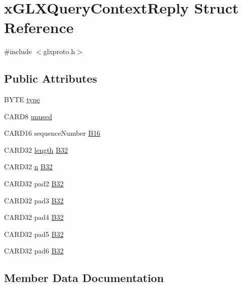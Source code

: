 \hypertarget{structx_g_l_x_query_context_reply}{}\section{x\+G\+L\+X\+Query\+Context\+Reply Struct Reference}
\label{structx_g_l_x_query_context_reply}


{\ttfamily \#include $<$glxproto.\+h$>$}

\subsection*{Public Attributes}
\begin{DoxyCompactItemize}
\item 
B\+Y\+TE \hyperlink{structx_g_l_x_query_context_reply_abcbb01ecc0ac4007ef024fc22a8637fd}{type}
\item 
C\+A\+R\+D8 \hyperlink{structx_g_l_x_query_context_reply_ad0794dd8b9bdbcffa2e2ac393abc31fe}{unused}
\item 
C\+A\+R\+D16 sequence\+Number \hyperlink{structx_g_l_x_query_context_reply_a8a1d02d94b834484164e9c7b7152c40f}{B16}
\item 
C\+A\+R\+D32 \hyperlink{glcorearb_8h_ab9c919755bde3b34349e23a32b4e0fa7}{length} \hyperlink{structx_g_l_x_query_context_reply_af42f5ab97ff04d994538bc7c3cd984e8}{B32}
\item 
C\+A\+R\+D32 \hyperlink{glcorearb_8h_ae2b4646468bc89d0ba646f5cf838e051}{n} \hyperlink{structx_g_l_x_query_context_reply_aca75e2ef1571becbca263faa37a5ed4c}{B32}
\item 
C\+A\+R\+D32 pad2 \hyperlink{structx_g_l_x_query_context_reply_a35907bf37144758d37f705e71fa790fa}{B32}
\item 
C\+A\+R\+D32 pad3 \hyperlink{structx_g_l_x_query_context_reply_af881169db1968b3ad65040b562f22496}{B32}
\item 
C\+A\+R\+D32 pad4 \hyperlink{structx_g_l_x_query_context_reply_a278ae324b5c6eced29fc1da7fc6f1671}{B32}
\item 
C\+A\+R\+D32 pad5 \hyperlink{structx_g_l_x_query_context_reply_a802a292c4dd845b51be8959e4a2995e9}{B32}
\item 
C\+A\+R\+D32 pad6 \hyperlink{structx_g_l_x_query_context_reply_ad606d849128558f3fd4f25cc29567076}{B32}
\end{DoxyCompactItemize}


\subsection{Member Data Documentation}
\mbox{\label{structx_g_l_x_query_context_reply_a8a1d02d94b834484164e9c7b7152c40f}} 
